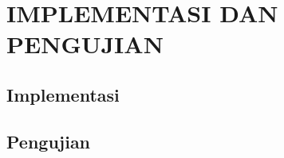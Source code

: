 \chapter{IMPLEMENTASI DAN PENGUJIAN}
\label{chapter:IMPLEMENTASI DAN PENGUJIAN}
\section{Implementasi}
\section{Pengujian}